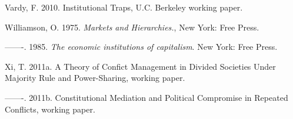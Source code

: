 \documentclass[12pt]{article}%
\begin{document}
\begin{thebibliography}{9}
 Vardy, F. 2010. Institutional Traps, U.C. Berkeley working paper. 

 Williamson, O. 1975. \textit{Markets and Hierarchies.}, New York: Free Press. 

 -------. 1985. \textit{The  economic  institutions  of  capitalism}. New  York: Free  Press.

 Xi, T. 2011a. A Theory of Confict Management in Divided Societies Under
Majority Rule and Power-Sharing, working paper. 

 -------. 2011b. Constitutional Mediation and Political Compromise in Repeated
Conflicts, working paper. 


\end{thebibliography}
\end{document}
